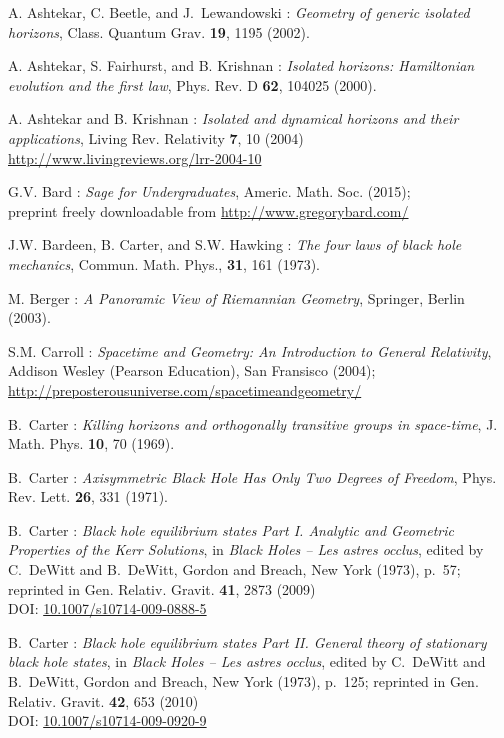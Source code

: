 \begin{thebibliography}{123}

A. Ashtekar, C. Beetle, and J.~Lewandowski : {\em Geometry of
generic isolated horizons},
Class. Quantum Grav. {\bf 19}, 1195 (2002).

A. Ashtekar, S. Fairhurst, and B. Krishnan : {\em Isolated horizons:
Hamiltonian evolution and the first law},
Phys. Rev. D {\bf 62}, 104025 (2000).

A. Ashtekar and B. Krishnan : {\em Isolated and dynamical horizons
and their applications},
Living Rev. Relativity {\bf 7}, 10 (2004) \\
\url{http://www.livingreviews.org/lrr-2004-10}

G.V. Bard : {\em Sage for Undergraduates}, Americ. Math. Soc. (2015); \\
preprint freely downloadable from \url{http://www.gregorybard.com/}

J.W. Bardeen, B. Carter, and S.W. Hawking : {\em The four laws of black
hole mechanics}, Commun. Math. Phys., {\bf 31}, 161 (1973).

M. Berger : {\em A Panoramic View of Riemannian Geometry},
Springer, Berlin (2003).

S.M. Carroll : \emph{Spacetime and Geometry: An Introduction to General Relativity},
Addison Wesley (Pearson Education), San Fransisco (2004); \\
\url{http://preposterousuniverse.com/spacetimeandgeometry/}

B.~Carter : {\em Killing horizons and orthogonally transitive groups
in space-time},
J. Math. Phys. {\bf 10}, 70 (1969).

B.~Carter : {\em Axisymmetric Black Hole Has Only Two Degrees of Freedom},
Phys. Rev. Lett. {\bf 26}, 331 (1971).

B.~Carter : {\em Black hole equilibrium states Part I.
Analytic and Geometric Properties of the Kerr Solutions},
in {\em Black Holes -- Les astres occlus},  edited by C.~DeWitt and B.~DeWitt,
Gordon and Breach, New York (1973), p.~57; reprinted in
Gen. Relativ. Gravit. {\bf 41}, 2873 (2009)\\
DOI: \href{http://dx.doi.org/doi:10.1007/s10714-009-0888-5}{10.1007/s10714-009-0888-5}

B.~Carter : {\em Black hole equilibrium states Part II. General theory of stationary black hole states}, in {\em Black Holes -- Les astres occlus},  edited by C.~DeWitt and B.~DeWitt,
Gordon and Breach, New York (1973), p.~125; reprinted in
Gen. Relativ. Gravit. {\bf 42}, 653 (2010)\\
DOI: \href{http://dx.doi.org/doi:10.1007/s10714-009-0920-9}{10.1007/s10714-009-0920-9}


\end{thebibliography}
